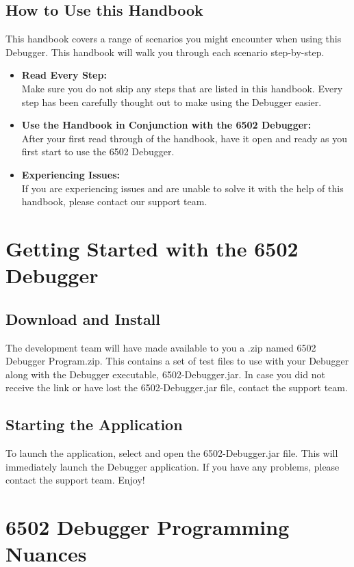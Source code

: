 \documentclass[a3paper, 11pt]{article}
\begin{document}
\subsection{How to Use this Handbook}
This handbook covers a range of scenarios you might encounter when using this Debugger. This handbook will walk you through each scenario step-by-step.
\begin{itemize}
	\item \textbf{Read Every Step:}\\
	Make sure you do not skip any steps that are listed in this handbook. Every step has been carefully thought out to make using the Debugger easier. 
	\item \textbf{Use the Handbook in Conjunction with the 6502 Debugger:}\\
	After your first read through of the handbook, have it open and ready as you first start to use the 6502 Debugger. 
	\item \textbf{Experiencing Issues:}\\
	If you are experiencing issues and are unable to solve it with the help of this handbook, please contact our support team. 
\end{itemize}
\pagebreak

\section{Getting Started with the 6502 Debugger}
\subsection{Download and Install}
The development team will have made available to you a .zip named 6502 Debugger Program.zip. This contains a set of test files to use with your Debugger along with the Debugger executable, 6502-Debugger.jar. In case you did not receive the link or have lost the 6502-Debugger.jar file, contact the support team. 
\subsection{Starting the Application}
To launch the application, select and open the 6502-Debugger.jar file. This will immediately launch the Debugger application. If you have any problems, please contact the support team. Enjoy!
\pagebreak

\section{6502 Debugger Programming Nuances}
\end{document}
